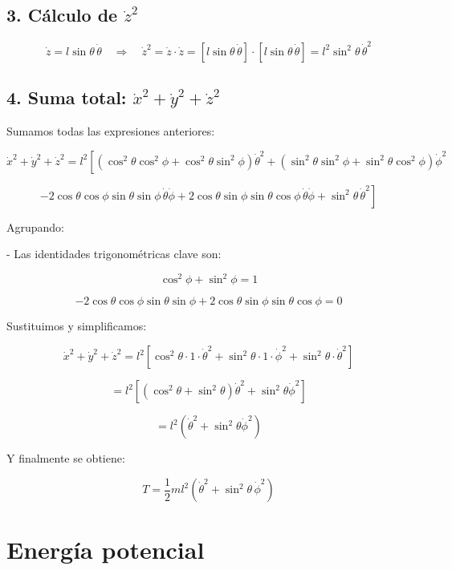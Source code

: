 \documentclass[12pt]{article}
\begin{document}
\subsection*{3. Cálculo de \(\dot{z}^2\)}

\[
\dot{z} = l \sin\theta \, \dot{\theta}
\quad \Rightarrow \quad
\dot{z}^2 = \dot{z}\cdot \dot{z} = [l \sin\theta \, \dot{\theta}] \cdot [l \sin\theta \, \dot{\theta}] =  l^2 \sin^2\theta \, \dot{\theta}^2
\]

\subsection*{4. Suma total: \( \dot{x}^2 + \dot{y}^2 + \dot{z}^2 \)}

Sumamos todas las expresiones anteriores:

\[
\dot{x}^2 + \dot{y}^2 + \dot{z}^2 = l^2 \left[ 
\left( \cos^2\theta \cos^2\phi + \cos^2\theta \sin^2\phi \right) \dot{\theta}^2
+ \left( \sin^2\theta \sin^2\phi + \sin^2\theta \cos^2\phi \right) \dot{\phi}^2 \right.
\]

\[
\left. - 2 \cos\theta \cos\phi \sin\theta \sin\phi \, \dot{\theta} \dot{\phi}
+ 2 \cos\theta \sin\phi \sin\theta \cos\phi \, \dot{\theta} \dot{\phi}
+ \sin^2\theta \, \dot{\theta}^2
\right]
\]

Agrupando:

- Las identidades trigonométricas clave son:

\[
\cos^2\phi + \sin^2\phi = 1
\]

\[
-2 \cos\theta \cos\phi \sin\theta \sin\phi + 2 \cos\theta \sin\phi \sin\theta \cos\phi = 0
\]

Sustituimos y simplificamos:

\[
\dot{x}^2 + \dot{y}^2 + \dot{z}^2 = l^2 \left[ 
\cos^2\theta \cdot 1 \cdot \dot{\theta}^2 + \sin^2\theta \cdot 1 \cdot \dot{\phi}^2 + \sin^2\theta \cdot \dot{\theta}^2 
\right]
\]

\[
= l^2 \left[ (\cos^2\theta + \sin^2\theta) \dot{\theta}^2 + \sin^2\theta \dot{\phi}^2 \right]
\]

\[
= l^2 \left(\dot{\theta}^2 + \sin^2\theta \dot{\phi}^2 \right)
\]

Y finalmente se obtiene:

\begin{equation}
T = \frac{1}{2} m l^2 \left( \dot{\theta}^2 + \sin^2\theta \, \dot{\phi}^2 \right)
\end{equation}
\label{Eq3}

\section*{Energía potencial}
\end{document}
